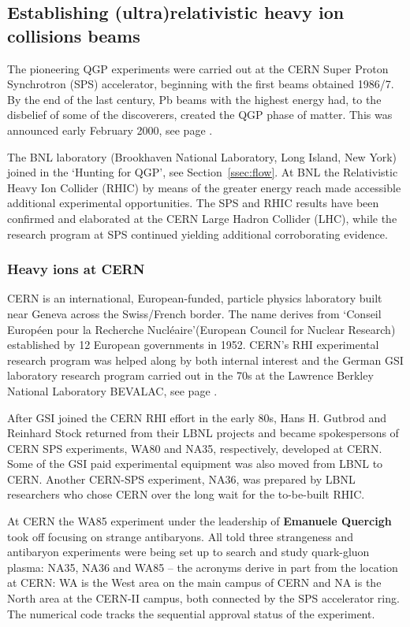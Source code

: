 \subsection{Establishing (ultra)relativistic heavy ion collisions beams}\label{ref:dst}
\label{HowQGP} 
The pioneering QGP experiments were carried out at the CERN Super Proton Synchrotron (SPS) accelerator, beginning with the first beams obtained 1986/7. By the end of the last century, Pb beams with the highest energy had, to the disbelief of some of the discoverers, created the QGP phase of matter. This was announced early February 2000, see page \pageref{CERN2000}. 

The BNL laboratory (Brookhaven National Laboratory, Long Island, New York) joined in the \lq Hunting for QGP\rq, see Section~\ref{ssec:flow}. At BNL the Relativistic Heavy Ion Collider (RHIC) by means of the greater energy reach made accessible additional experimental opportunities. The SPS and RHIC results have been confirmed and elaborated at the CERN Large Hadron Collider (LHC), while the research program at SPS continued yielding additional corroborating evidence. 
 
\subsubsection{Heavy ions at CERN}\label{sec:RHI-CERN}
CERN\label{CERN} is an international, European-funded, particle physics laboratory built near Geneva across the Swiss/French border. The name derives from \lq Conseil Europ\' een pour la Recherche Nucl\' eaire\rq (European Council for Nuclear Research) established by 12 European governments in 1952. CERN\rq s RHI experimental research program was helped along by both internal interest and the German GSI laboratory research program carried out in the 70s at the Lawrence Berkley National Laboratory BEVALAC, see page \pageref{BEVALAC}. 

After GSI joined the CERN RHI effort in the early 80s, Hans H. Gutbrod and Reinhard Stock returned from their LBNL projects and became spokespersons of CERN SPS experiments, WA80 and NA35, respectively, developed at CERN. Some of the GSI paid experimental equipment was also moved from LBNL to CERN. Another CERN-SPS experiment, NA36, was prepared by LBNL researchers who chose CERN over the long wait for the to-be-built RHIC. 

At CERN the WA85 experiment under the leadership of \textbf{Emanuele Quercigh} took off focusing on strange antibaryons. All told three strangeness and antibaryon experiments were being set up to search and study quark-gluon plasma: NA35, NA36 and WA85 -- the acronyms derive in part from the location at CERN: WA is the West area on the main campus of CERN and NA is the North area at the CERN-II campus, both connected by the SPS accelerator ring. The numerical code tracks the sequential approval status of the experiment.\\

